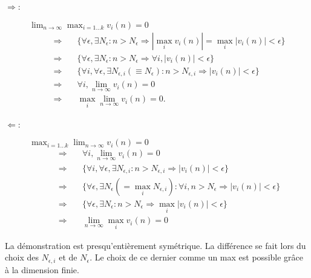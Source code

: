 \begin{description}
  \item[$\Rightarrow$:] $\lim_{n \to \infty} \max_{i=1 \dots k} v_i(n) = 0$
  \begin{align*}
    \Rightarrow \quad & \{\forall \epsilon, \exists N_\epsilon: n > N_\epsilon \Rightarrow |\max_i v_i(n)| = \max_i |v_i(n)| < \epsilon\} \\
    \Rightarrow \quad & \{\forall \epsilon, \exists N_\epsilon: n > N_\epsilon \Rightarrow \forall i, |v_i(n)| < \epsilon\} \\
    \Rightarrow \quad & \{\forall i, \forall \epsilon, \exists N_{\epsilon, i}(\equiv N_\epsilon): n > N_{\epsilon, i} \Rightarrow |v_i(n)| < \epsilon\} \\
    \Rightarrow \quad & \forall i, \lim_{n \to \infty} v_i(n) = 0 \\
    \Rightarrow \quad & \max_i \lim_{n \to \infty} v_i(n) = 0.
  \end{align*}
  \item[$\Leftarrow$:] $\max_{i=1 \dots k} \lim_{n \to \infty} v_i(n) = 0$
  \begin{align*}
    \Rightarrow \quad & \forall i, \lim_{n \to \infty} v_i(n) = 0 \\
    \Rightarrow \quad & \{\forall i, \forall \epsilon, \exists N_{\epsilon, i}: n > N_{\epsilon, i} \Rightarrow |v_i(n)| < \epsilon\}\\
    \Rightarrow \quad & \{\forall \epsilon, \exists N_\epsilon (= \max_i N_{\epsilon, i}): \forall i, n > N_\epsilon \Rightarrow |v_i(n)| < \epsilon\}\\
    \Rightarrow \quad & \{\forall \epsilon, \exists N_\epsilon: n > N_\epsilon \Rightarrow \max_i |v_i(n)| < \epsilon\}\\
    \Rightarrow \quad & \lim_{n \to \infty} \max_i v_i(n) = 0
  \end{align*}
\end{description}
\eproof

\remark
La démonstration est presqu'entièrement symétrique. La différence se fait lors du choix des $N_{\epsilon, i}$ et de $N_\epsilon$. Le choix de ce dernier comme un max est possible grâce à la dimension finie.

